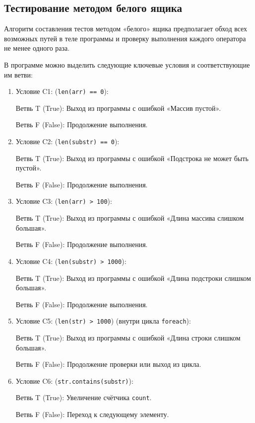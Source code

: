 \documentclass{article}[14pt]
\begin{document}
\subsection{Тестирование методом белого ящика}

Алгоритм составления тестов методом «белого» ящика предполагает обход всех
возможных путей в теле программы и проверку выполнения каждого оператора не
менее одного раза.

В программе можно выделить следующие ключевые условия и соответствующие им ветви:

\begin{enumerate}
    \item Условие C1: (\texttt{len(arr) == 0}):

        Ветвь T (True): Выход из программы с ошибкой «Массив пустой».

        Ветвь F (False): Продолжение выполнения.

    \item Условие C2: (\texttt{len(substr) == 0}):

        Ветвь T (True): Выход из программы с ошибкой «Подстрока не может быть пустой».

        Ветвь F (False): Продолжение выполнения.

    \item Условие C3: (\texttt{len(arr) > 100}):

        Ветвь T (True): Выход из программы с ошибкой «Длина массива слишком большая».

        Ветвь F (False): Продолжение выполнения.

    \item Условие C4: (\texttt{len(substr) > 1000}):

        Ветвь T (True): Выход из программы с ошибкой «Длина подстроки слишком большая».

        Ветвь F (False): Продолжение выполнения.

    \item Условие C5: (\texttt{len(str) > 1000}) (внутри цикла \texttt{foreach}):

        Ветвь T (True): Выход из программы с ошибкой «Длина строки слишком большая».

        Ветвь F (False): Продолжение проверки или выход из цикла.

    \item Условие C6: (\texttt{str.contains(substr)}):

        Ветвь T (True): Увеличение счётчика \texttt{count}.

        Ветвь F (False): Переход к следующему элементу.
\end{enumerate}
\end{document}
